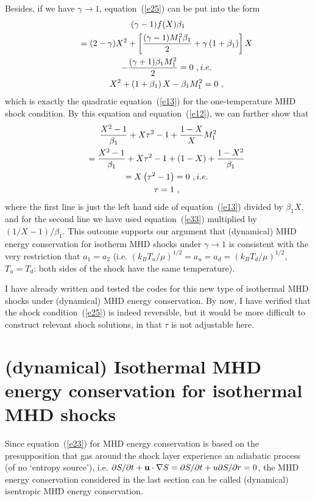 \documentclass[fleqn,usenatbib]{mnras}
\begin{document}
Besides, if we have $\gamma\rightarrow 1$, equation~(\ref{e25}) can be put into the form
\begin{gather}
(\gamma-1)f(X)\beta_{1}\notag\\
\qquad =(2-\gamma)X^{2}+\left[\frac{(\gamma-1)M_{1}^{2}\beta_{1}}{2}+\gamma\left(1+\beta_{1}\right)\right]X\notag\\
\qquad -\frac{(\gamma+1)\beta_{1}M_{1}^{2}}{2}=0\ ,i.e.\notag\\
\qquad X^{2}+\left(1+\beta_{1}\right)X-\beta_{1}M_{1}^{2}=0\ ,\label{e33}
\end{gather}
which is exactly the quadratic equation~(\ref{e13}) for the one-temperature MHD shock condition. By this equation and equation~(\ref{e12}), we can further show that
\begin{gather}
\frac{X^{2}-1}{\beta_{1}}+X\tau^{2}-1+\frac{1-X}{X}M_{1}^{2}\notag\\
\qquad = \frac{X^{2}-1}{\beta_{1}}+X\tau^{2}-1+(1-X)+\frac{1-X^{2}}{\beta_{1}}\notag\\
\qquad =X\left(\tau^{2}-1\right)=0\ ,i.e.\notag\\
\qquad\tau=1\ ,\label{e35}
\end{gather}
where the first line is just the left hand side of equation~(\ref{e13}) divided by $\beta_{1}X$, and for the second line we have used equation~(\ref{e33}) multiplied by $(1/X-1)/\beta_{1}$. This outcome supports our argument that (dynamical) MHD energy conservation for isotherm MHD shocks under $\gamma\rightarrow 1$ is consistent with the very restriction that $a_{1}=a_{2}$ (i.e. $\left(k_{B}T_{u}/\mu\right)^{1/2}=a_{u}=a_{d}=\left(k_{B}T_{d}/\mu\right)^{1/2}$, $T_{u}=T_{d}$: both sides of the shock have the same temperature).

I have already written and tested the codes for this new type of isothermal MHD shocks under (dynamical) MHD energy conservation. By now, I have verified that the shock condition~(\ref{e25}) is indeed reversible, but it would be more difficult to construct relevant shock solutions, in that $\tau$ is not adjustable here.

\section{(dynamical) Isothermal MHD energy conservation for isothermal MHD shocks}
Since equation~(\ref{e23}) for MHD energy conservation is based on the presupposition that gas around the shock layer experience an adiabatic process (of no `entropy source'), i.e. $\partial S/\partial t+{\bf{u}} \cdot\nabla S=\partial S/\partial t+u\partial S/\partial r=0$, the MHD energy conservation considered in the last section can be called (dynamical) isentropic MHD energy conservation. 
\end{document}

